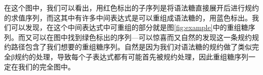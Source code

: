 在这个图中，我们可以看出，用{\color[rgb]{1,0,0}红色}标出的子序列是将语法糖直接展开后进行规约的求值序列，而这其中有许多中间表达式是可以重组成语法糖的，用{\color[rgb]{0,0,1}蓝色}标出。我们可以发现，在这个中间表达式中可重组的部分就是图\ref{fig:example}中的重组糖序列。而又可以在图中找到{\color[rgb]{0,1,0}绿色}标出的序列---可以惊喜而又自然的发现这一条规约规约路径包含了我们想要的重组糖序列。自然是因为我们对语法糖的规约做了类似完全β规约的处理，导致每个子表达式都有可能首先被规约处理，因此重组糖序列一定在我们的完全图中。
